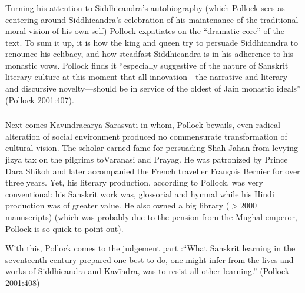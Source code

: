 \subsubsection{} Turning his attention to Siddhicandra’s autobiography (which Pollock sees as centering around Siddhicandra’s celebration of his maintenance of the traditional moral vision of his own self) Pollock expatiates on the “dramatic core” of the text. To sum it up, it is how the king and queen try to persuade Siddhicandra to renounce his celibacy, and how steadfast Siddhicandra is in his adherence to his monastic vows. Pollock finds it “especially suggestive of the nature of Sanskrit literary culture at this moment that all innovation—the narrative and literary and discursive novelty—should be in service of the oldest of Jain monastic ideals” (Pollock 2001:407).

\subsubsection{} Next comes Kavīndrācārya Sarasvatī in whom, Pollock bewails, even radical alteration of social environment produced no commensurate transformation of cultural vision. The scholar earned fame for persuading Shah Jahan from levying jizya tax on the pilgrims to\break Varanasi and Prayag. He was patronized by Prince Dara Shikoh and later accompanied the French traveller François Bernier for over three years. Yet, his literary production, according to Pollock, was very conventional: his Sanskrit work was, glossorial and hymnal while his Hindi production was of greater value. He also owned a big library 
($>2000$ manuscripts) (which was probably due to the pension from the Mughal emperor, Pollock is so quick to point out).

With this, Pollock comes to the judgement part :“What Sanskrit learning in the seventeenth century prepared one best to do, one might infer from the lives and works of Siddhicandra and Kavīndra, was to resist all other learning.” (Pollock 2001:408)

